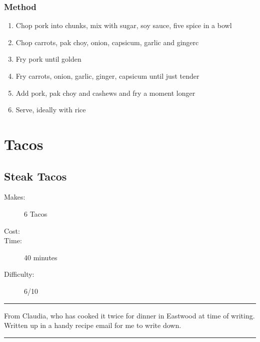 \documentclass[]{article}
\begin{document}
\subsubsection*{\Large Method}
\begin{enumerate}[font=\huge\color{accent}]
	\item Chop pork into chunks, mix with sugar, soy sauce, five spice in a bowl
	\item Chop carrots, pak choy, onion, capsicum, garlic and gingerc
	\item Fry pork until golden
	\item Fry carrots, onion, garlic, ginger, capsicum until just tender
	\item Add pork, pak choy and cashews and fry a moment longer
	\item Serve, ideally with rice
\end{enumerate}
\newpage
{}
\section*{\center\Huge\color{accent}Tacos}
\label{cat:Tacos}
\label{rec:Steak Tacos}
\subsection*{\center\huge Steak Tacos}
\begin{description}
\item[Makes:] 6 Tacos
\item[Cost:] \textdollar
\item[Time:] 40 minutes
\item[Difficulty:] 6/10
\end{description}
\vspace{0.2cm}\hrule\vspace{0.5cm}
\begin{adjustwidth}{0.5 cm}{0.5 cm}

From Claudia, who has cooked it twice for dinner in Eastwood at time of writing. Written up in a handy recipe email for me to write down. \hfill{}\color{black}

\end{adjustwidth}
\vspace{0.5cm}\hrule
\end{document}

